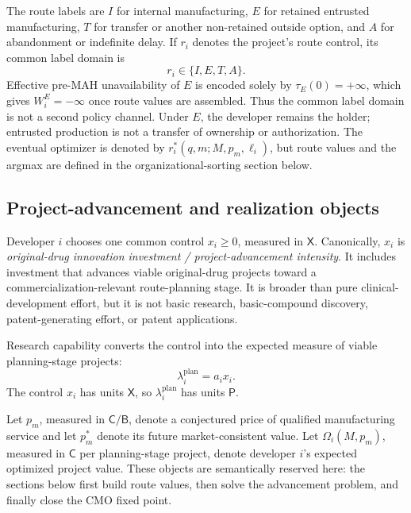 The route labels are \(I\) for internal manufacturing, \(E\) for retained
entrusted manufacturing, \(T\) for transfer or another non-retained outside
option, and \(A\) for abandonment or indefinite delay.  If \(r_i\) denotes the
project's route control, its common label domain is
\begin{equation}
  r_i\in\{I,E,T,A\}.
  \label{eq:p01-route-domain}
\end{equation}
Effective pre-MAH unavailability of \(E\) is encoded solely by
\(\tau_E(0)=+\infty\), which gives \(W_i^E=-\infty\) once route values are
assembled.  Thus the common label domain is not a second policy channel.
Under \(E\), the developer remains the holder; entrusted production is not a
transfer of ownership or authorization.  The eventual optimizer is denoted by
\(r_i^*(q,m;M,p_m,\ell_i)\), but route values and the argmax are defined in the
organizational-sorting section below.

\subsection{Project-advancement and realization objects}
\label{subsec:p01-advancement-realization}

Developer \(i\) chooses one common control \(x_i\geq0\), measured in
\(\mathsf X\).  Canonically, \(x_i\) is
\emph{original-drug innovation investment / project-advancement intensity}.
It includes investment that advances viable original-drug projects toward a
commercialization-relevant route-planning stage.  It is broader than pure
clinical-development effort, but it is not basic research, basic-compound
discovery, patent-generating effort, or patent applications.

Research capability converts the control into the expected measure of viable
planning-stage projects:
\begin{equation}
  \lambda_i^{\mathrm{plan}}=a_ix_i.
  \label{eq:p01-planned-intensity}
\end{equation}
The control \(x_i\) has units \(\mathsf X\), so
\(\lambda_i^{\mathrm{plan}}\) has units \(\mathsf P\).

Let \(p_m\), measured in \(\mathsf C/\mathsf B\), denote a conjectured price
of qualified manufacturing service and let \(p_m^*\) denote its future
market-consistent value.  Let \(\Omega_i(M,p_m)\), measured in \(\mathsf C\)
per planning-stage project, denote developer \(i\)'s expected optimized project
value.  These objects are semantically reserved here: the sections below first
build route values, then solve the advancement problem, and finally close the
CMO fixed point.

